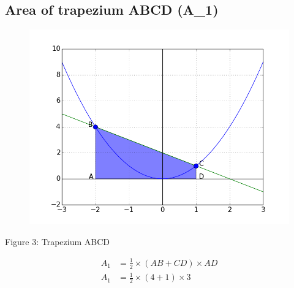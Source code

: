 \documentclass[journal,12pt,twocolumn]{IEEEtran}
\begin{document}
\subsection{\textbf{Area of trapezium ABCD (A_1)}}
\begin{figure}[H]
    \centering
    \includegraphics[width=\columnwidth]{Figures/trapezium.png}
\end{figure}
\begin{center}
    Figure 3: Trapezium ABCD
\end{center}
\begin{align}
    A_1 &= \frac{1}{2}\times(AB + CD)\times AD\\
    A_1 &= \frac{1}{2}\times(4 + 1)\times 3
\end{align}
\begin{center}
\end{center}
\end{document}

